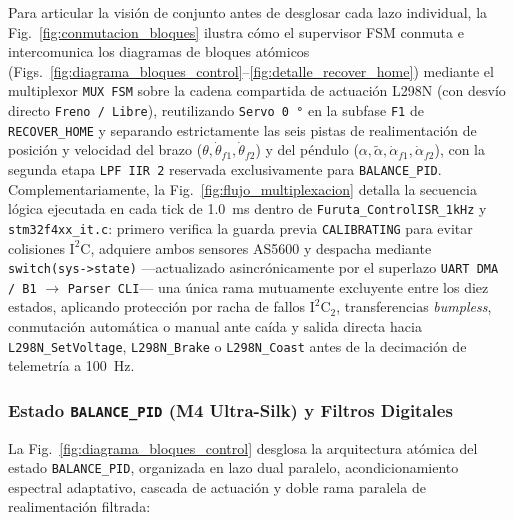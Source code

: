 


Para articular la visión de conjunto antes de desglosar cada lazo individual, la Fig.~\ref{fig:conmutacion_bloques} ilustra cómo el supervisor FSM conmuta e intercomunica los diagramas de bloques atómicos (Figs.~\ref{fig:diagrama_bloques_control}--\ref{fig:detalle_recover_home}) mediante el multiplexor \texttt{MUX FSM} sobre la cadena compartida de actuación L298N (con desvío directo \texttt{Freno / Libre}), reutilizando \texttt{Servo \qty{0}{\degree}} en la subfase \texttt{F1} de \texttt{RECOVER\_HOME} y separando estrictamente las seis pistas de realimentación de posición y velocidad del brazo ($\theta, \dot{\theta}_{f1}, \dot{\theta}_{f2}$) y del péndulo ($\alpha, \tilde{\alpha}, \dot{\alpha}_{f1}, \dot{\alpha}_{f2}$), con la segunda etapa \texttt{LPF IIR 2} reservada exclusivamente para \texttt{BALANCE\_PID}. Complementariamente, la Fig.~\ref{fig:flujo_multiplexacion} detalla la secuencia lógica ejecutada en cada tick de \qty{1.0}{\milli\second} dentro de \texttt{Furuta\_ControlISR\_1kHz} y \texttt{stm32f4xx\_it.c}: primero verifica la guarda previa \texttt{CALIBRATING} para evitar colisiones $\text{I}^2\text{C}$, adquiere ambos sensores AS5600 y despacha mediante \texttt{switch(sys->state)} ---actualizado asincrónicamente por el superlazo \texttt{UART DMA / B1} $\to$ \texttt{Parser CLI}--- una única rama mutuamente excluyente entre los diez estados, aplicando protección por racha de fallos $\text{I}^2\text{C}_2$, transferencias \textit{bumpless}, conmutación automática o manual ante caída y salida directa hacia \texttt{L298N\_SetVoltage}, \texttt{L298N\_Brake} o \texttt{L298N\_Coast} antes de la decimación de telemetría a \qty{100}{\hertz}.

\subsubsection{Estado \texttt{BALANCE\_PID} (M4 Ultra-Silk) y Filtros Digitales}



La Fig.~\ref{fig:diagrama_bloques_control} desglosa la arquitectura atómica del estado \texttt{BALANCE\_PID}, organizada en lazo dual paralelo, acondicionamiento espectral adaptativo, cascada de actuación y doble rama paralela de realimentación filtrada:

